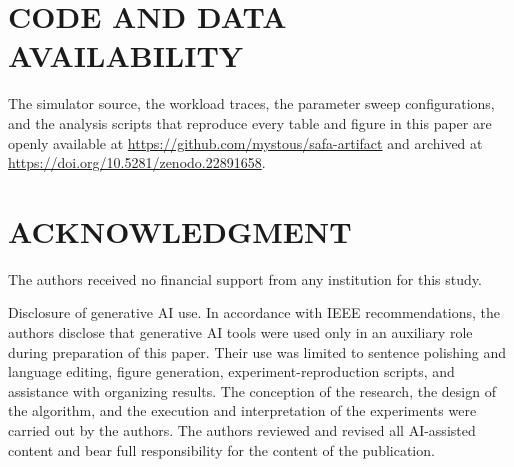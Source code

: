 \documentclass{ieeetj}
\begin{document}
\FloatBarrier
\section*{CODE AND DATA AVAILABILITY}
The simulator source, the workload traces, the parameter sweep configurations, and the analysis scripts that reproduce every table and figure in this paper are openly available at \url{https://github.com/mystous/safa-artifact} and archived at \url{https://doi.org/10.5281/zenodo.22891658}.

\section*{ACKNOWLEDGMENT}
The authors received no financial support from any institution for this study.

Disclosure of generative AI use. In accordance with IEEE recommendations, the authors disclose that generative AI tools were used only in an auxiliary role during preparation of this paper. Their use was limited to sentence polishing and language editing, figure generation, experiment-reproduction scripts, and assistance with organizing results. The conception of the research, the design of the algorithm, and the execution and interpretation of the experiments were carried out by the authors. The authors reviewed and revised all AI-assisted content and bear full responsibility for the content of the publication.

\balance


\end{document}
